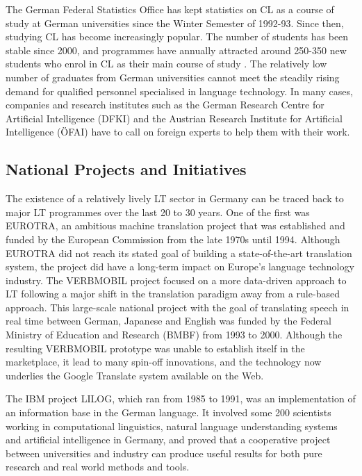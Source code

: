 \documentclass[]{../../metanetpaper}
\begin{document}
\begin{multicols}{2}
The German Federal Statistics Office has kept statistics on CL as a course of study at German universities since the Winter Semester of 1992-93. Since then, studying CL has become increasingly popular. The number of students has been stable since 2000, and programmes have annually attracted around 250-350 new students who enrol in CL as their main course of study \cite{wie1}. The relatively low number of graduates from German universities cannot meet the steadily rising demand for qualified personnel specialised in language technology. In many cases, companies and research institutes such as the German Research Centre for Artificial Intelligence (DFKI) and the Austrian Research Institute for Artificial Intelligence (ÖFAI) have to call on foreign experts to help them with their work.

\subsection{National Projects and Initiatives}

The existence of a relatively lively LT sector in Germany can be traced back to major LT programmes over the last 20 to 30 years. One of the first was EUROTRA, an ambitious machine translation project that was established and funded by the European Commission from the late 1970s until 1994. Although EUROTRA did not  reach its stated goal of building a state-of-the-art translation system, the project did have a long-term impact on Europe’s language technology industry. The VERBMOBIL project focused on a more data-driven approach to LT following a major shift in the translation paradigm away from a rule-based approach. This large-scale national project with the goal of translating speech in real time between German, Japanese and English was funded by the Federal Ministry of Education and Research (BMBF) from 1993 to 2000. Although the resulting VERBMOBIL prototype was unable to establish itself in the marketplace, it lead to many spin-off innovations, and the technology now underlies the Google Translate system available on the Web. 

    The IBM project LILOG, which ran from 1985 to 1991, was an implementation of an information base in the German language. It involved some 200 scientists working in computational linguistics, natural language understanding systems and artificial intelligence in Germany, and proved that a cooperative project between universities and industry can produce useful results for both pure research and real world methods and tools.


\end{multicols}
\end{document}
